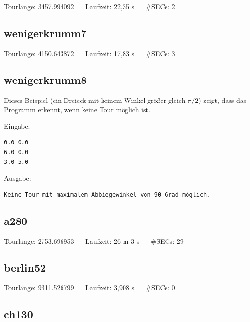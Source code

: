 \documentclass[a4paper, 10pt, ngerman]{article}
\begin{document}


\noindent Tourlänge: 3457.994092 $\quad$ Laufzeit: 22,35 s $\quad$ \#SECs: 2

\subsection{wenigerkrumm7}



\noindent Tourlänge: 4150.643872 $\quad$ Laufzeit: 17,83 s $\quad$ \#SECs: 3

\subsection{wenigerkrumm8}

Dieses Beispiel (ein Dreieck mit keinem Winkel größer gleich $\pi / 2$) zeigt, dass das Programm erkennt, wenn keine Tour möglich ist.
\medskip

\noindent Eingabe:
\begin{verbatim}
0.0 0.0
6.0 0.0
3.0 5.0
\end{verbatim}

\noindent Ausgabe:
\begin{verbatim}
Keine Tour mit maximalem Abbiegewinkel von 90 Grad möglich.
\end{verbatim}

\subsection{a280}



\noindent Tourlänge: 2753.696953 $\quad$ Laufzeit: 26 m 3 s $\quad$ \#SECs: 29

\subsection{berlin52}



\noindent Tourlänge: 9311.526799 $\quad$ Laufzeit: 3,908 s $\quad$ \#SECs: 0

\subsection{ch130}


\end{document}
